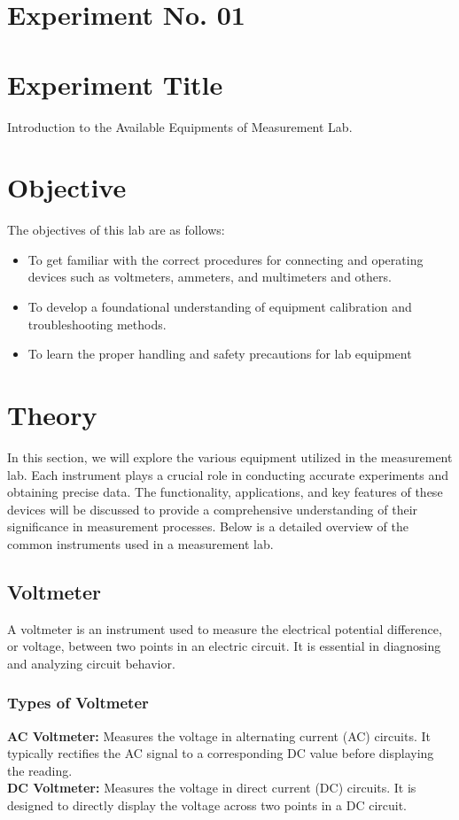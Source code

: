 \documentclass[a4paper,12pt]{article}
\begin{document}
	\section{Experiment No. 01}
	\section{Experiment Title}
	Introduction to the Available Equipments of Measurement Lab.
	\section{Objective}
	The objectives of this lab are as follows:
	\begin{itemize}
		\item 	To get familiar with the correct procedures for connecting and operating devices such as
		voltmeters, ammeters, and multimeters and others.
		\item To develop a foundational understanding of equipment calibration and troubleshooting
		methods.
		\item  To learn the proper handling and safety precautions for lab equipment
    \end{itemize}

	\section{Theory}

	In this section, we will explore the various equipment utilized in the measurement lab. Each instrument plays a crucial role in conducting accurate experiments and obtaining precise data. The functionality, applications, and key features of these devices will be discussed to provide a comprehensive understanding of their significance in measurement processes. Below is a detailed overview of the common instruments
	used in a measurement lab.
	
\subsection{Voltmeter}
A voltmeter is an instrument used to measure the electrical potential difference, or voltage, between two points in an electric circuit. It is essential in diagnosing and analyzing circuit behavior.

\subsubsection{Types of Voltmeter}
\textbf{AC Voltmeter:} Measures the voltage in alternating current (AC) circuits. It typically rectifies the AC signal to a corresponding DC value before displaying the reading. \\
\textbf{DC Voltmeter:} Measures the voltage in direct current (DC) circuits. It is designed to directly display the voltage across two points in a DC circuit.
\end{document}

